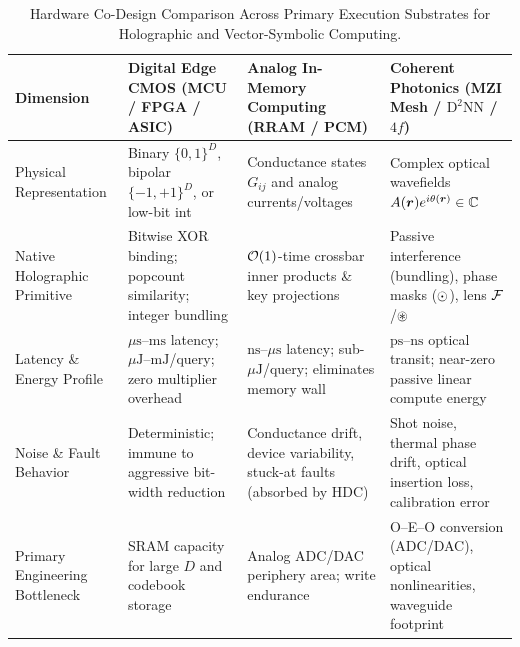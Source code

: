 \begin{table}[htbp]
\centering
\caption{Hardware Co-Design Comparison Across Primary Execution Substrates for Holographic and Vector-Symbolic Computing.}
\label{tab:hardware_substrates}
\scriptsize
\setlength{\tabcolsep}{4pt}
\renewcommand{\arraystretch}{1.24}
\begin{tabularx}{\textwidth}{@{} >{\raggedright\arraybackslash}p{2.25cm} >{\raggedright\arraybackslash}X >{\raggedright\arraybackslash}X >{\raggedright\arraybackslash}X @{}}
\toprule
\textbf{Dimension} & \textbf{Digital Edge CMOS (MCU / FPGA / ASIC)} & \textbf{Analog In-Memory Computing (RRAM / PCM)} & \textbf{Coherent Photonics (MZI Mesh / $\text{D}^2\text{NN}$ / $4f$)} \\
\midrule
Physical Representation & Binary $\{0,1\}^D$, bipolar $\{-1,+1\}^D$, or low-bit int & Conductance states $G_{ij}$ and analog currents/voltages & Complex optical wavefields $A(\boldsymbol{r})e^{i\theta(\boldsymbol{r})} \in \mathbb{C}$ \\
\addlinespace[2pt]
Native Holographic Primitive & Bitwise XOR binding; popcount similarity; integer bundling & $\mathcal{O}\!\left(1\right)$-time crossbar inner products \& key projections & Passive interference (bundling), phase masks ($\odot$), lens $\mathcal{F}$/$\circledast$ \\
\addlinespace[2pt]
Latency \& Energy Profile & $\mu\text{s}$--$\text{ms}$ latency; $\mu\text{J}$--$\text{mJ}$/query; zero multiplier overhead & $\text{ns}$--$\mu\text{s}$ latency; sub-$\mu\text{J}$/query; eliminates memory wall & $\text{ps}$--$\text{ns}$ optical transit; near-zero passive linear compute energy \\
\addlinespace[2pt]
Noise \& Fault Behavior & Deterministic; immune to aggressive bit-width reduction & Conductance drift, device variability, stuck-at faults (absorbed by HDC) & Shot noise, thermal phase drift, optical insertion loss, calibration error \\
\addlinespace[2pt]
Primary Engineering Bottleneck & SRAM capacity for large $D$ and codebook storage & Analog ADC/DAC periphery area; write endurance & O--E--O conversion (ADC/DAC), optical nonlinearities, waveguide footprint \\
\bottomrule
\end{tabularx}
\end{table}

